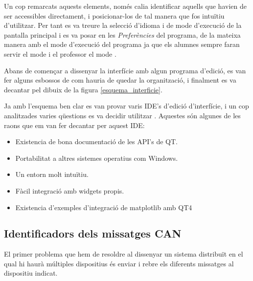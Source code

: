 Un cop remarcats aquests elements, només calia identificar aquells que havien de ser accessibles directament, i posicionar-los de tal manera que fos intuïtiu d'utilitzar. Per tant es va treure la selecció d'idioma i de mode d'execució de la pantalla principal i es va posar en les \emph{Preferències} del programa, de la mateixa manera amb el mode d'execució del programa ja que els alumnes sempre faran servir el mode \SensorActuador i el professor el mode \Monitor.

Abans de començar a dissenyar la interfície amb algun programa d'edició, es van fer alguns esbossos de com hauria de quedar la organització, i finalment es va decantar pel dibuix de la figura \ref{esquema_interficie}.


Ja amb l'esquema ben clar es van provar varis IDE's d'edició d'interfície, i un cop analitzades varies qüestions es va decidir utilitzar \QTCreator. Aquestes són algunes de les raons que em van fer decantar per aquest IDE:

\begin{itemize}
	\item Existencia de bona documentació de les API's de QT.
	\item Portabilitat a altres sistemes operatius com Windows.
	\item Un entorn molt intuïtiu.
	\item Fàcil integració amb widgets propis.
	\item Existencia d'exemples d'integració de matplotlib amb QT4 \cite[Capítol 6 del llibre \emph{Matplotlib for Python Developers}]{EmbedMatQT4}
\end{itemize}

\subsection{Identificadors dels missatges CAN}\label{cap:dis:idCAN}

El primer problema que hem de resoldre al dissenyar un sistema distribuït en el qual hi haurà múltiples dispositius és enviar i rebre els diferents missatges al dispositiu indicat.

